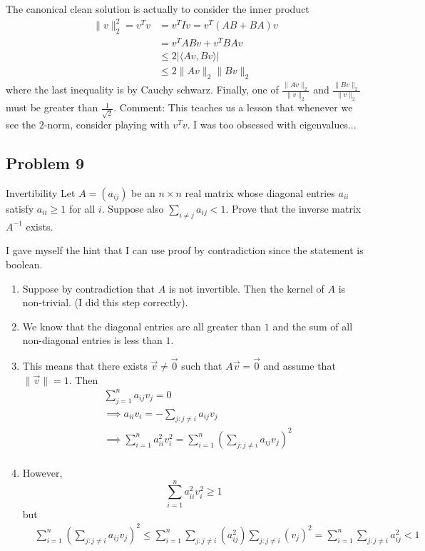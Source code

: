\documentclass[../main]{subfiles}
\begin{document}
\begin{solution}
    The canonical clean solution is actually to consider the inner product
    \begin{align*}
        \|v\|_2^2 =v^T v &= v^T I v = v^T(AB+BA)v\\
        &= v^T AB v + v^T BA v\\
        &\leq 2 |\langle Av, Bv \rangle| \\
        &\le 2 \|Av\|_2 \|Bv\|_2    
        \end{align*}
        where the last inequality is by Cauchy schwarz.
        \newline
        Finally, one of $\frac{\|Av\|_2}{\|v\|_2}$ and $\frac{\|Bv\|_2}{\|v\|_2}$ must be greater than $\frac{1}{\sqrt{2}}$. 
        \newline
        Comment: This teaches us a lesson that whenever we see the $2$-norm, consider playing with $v^Tv$. I was too obsessed with eigenvalues...
\end{solution} 

\subsection{Problem 9}

\begin{bbox}{Invertibility}
    Let $A=(a_{ij})$ be an $n\times n$ real matrix whose diagonal entries $a_{ii}$ satisfy $a_{ii}\ge 1$ for all $i$. Suppose also $\sum_{i\ne j} a_{ij} < 1$. Prove that the inverse matrix $A^{-1}$ exists.
\end{bbox}
\begin{solution}
    I gave myself the hint that I can use proof by contradiction since the statement is boolean.
    \begin{enumerate}
        \item Suppose by contradiction that $A$ is not invertible. Then the kernel of $A$ is non-trivial. (I did this step correctly). 
        \item We know that the diagonal entries are all greater than $1$ and the sum of all non-diagonal entries is less than $1$.
        \item This means that there exists $\vec v \ne \vec 0$ such that $A\vec v = \vec 0$ and assume that $\|\vec v\| = 1$. Then
        \begin{align*}
            &\sum_{j=1}^n a_{ij} v_j  =0\\
            &\implies a_{ii}v_{i} = -\sum_{j:j\ne i}a_{ij} v_j\\
            &\implies \sum_{i=1}^n a_{ii}^2 v_i^2 = \sum_{i=1}^n (\sum_{j:j\neq i}a_{ij}v_j)^2\\
        \end{align*}
        \item However, \[
        \sum_{i=1}^n a_{ii}^2 v_i^2\ge 1
        \]
        but 
        \begin{align*}
        &\sum_{i=1}^n(\sum_{j:j\ne i}a_{ij}v_j)^2 \le \sum_{i=1}^n \sum_{j:j\ne i}(a_{ij}^2) \sum_{j:j\ne i}(v_j)^2 = \sum_{i=1}^n \sum_{j: j\ne i} a_{ij}^2 < 1
        \end{align*}
    \end{enumerate}
\end{solution}
\end{document}
